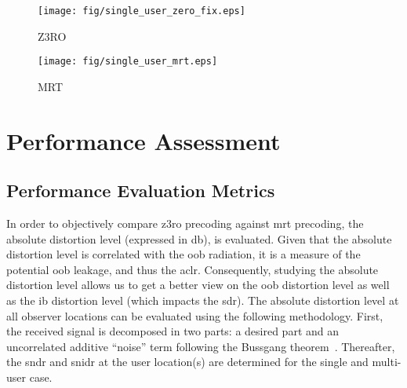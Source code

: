 \documentclass[conference]{IEEEtran}
\newcommand{\update}[1]{{#1}}
\newcommand{\zero}[0]{\gls{z3ro}\xspace}
\newcommand{\zerop}[0]{\zero precoder\xspace}
\newcommand{\mrt}[0]{\gls{mrt}\xspace}
\begin{document}
\begin{figure*}
    \centering
        \begin{subfigure}{0.90\columnwidth}
        \centering
            \texttt{[image: fig/single\_user\_zero\_fix.eps]}%
            \caption{Z3RO}%
            \label{subfiga}%
        \end{subfigure}\hspace*{35pt}%
        \begin{subfigure}{0.90\columnwidth}
        \centering
            \texttt{[image: fig/single\_user\_mrt.eps]}%
            \caption{MRT}%
            \label{subfigb}%
        \end{subfigure}\hfill%
    \caption{\small Heatmap of the distortion at all observer locations, for $p_{\mathrm{in}}/p_{\mathrm{sat}}$ = \SI{-3.1}{\decibel}. The distortion level at the user location is reduced for the \zerop, while it is slightly higher at unintended locations. \update{The circles denote the measurement locations, and the black icon the base station. The position highlighted with an arrow is the position used in Fig.~\ref{fig:r}. (approximate area of \SI{25000}{\metre\squared})}}
    \label{fig:single_user_heatmap}
\end{figure*}

\section{Performance Assessment}

\subsection{Performance Evaluation Metrics}\label{sec:kpi}
In order to objectively compare \zero precoding against \mrt precoding, the absolute distortion level (expressed in \si{\decibel}), is evaluated. Given that the absolute distortion level is correlated with the \gls{oob} radiation, it is a measure of the potential \gls{oob} leakage, and thus the \gls{aclr}. Consequently, studying the absolute distortion level allows us to get a better view on the \gls{oob} distortion level as well as the \gls{ib} distortion level (which impacts the \gls{sdr}).
The absolute distortion level at all observer locations can be evaluated using the following methodology. First, the received signal is decomposed in two parts: a desired part and an uncorrelated additive ``noise'' term following the Bussgang theorem~\cite{bussgang1952crosscorrelation,demir2020bussgang}. Thereafter, the \gls{sndr} and \gls{snidr} at the user location(s) are determined for the single and multi-user case.
\end{document}
